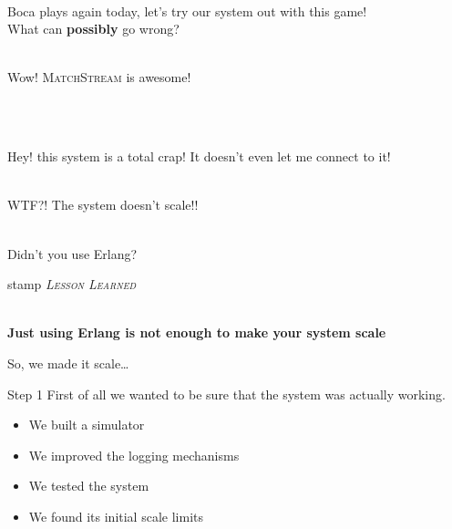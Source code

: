 \documentclass[utf8]{beamer}
\begin{document}
\begin{frame}
	\begin{description}
		\item<+->[Brujo]\ \\ Boca plays again today, let's try our system out with this game!\\ What can \textbf{possibly} go wrong?
		\item<+->[User 1]\ \\ Wow! \textsc{MatchStream} is awesome!
		\item<+->[\ldots]\ 
		\item<+->[User 100]\ \\ Hey! this system is a total crap! It doesn't even let me connect to it!
		\item<+->[Brujo]\ \\ WTF?! \alert{The system doesn't scale}!!
		\item<+->[A Friend]\ \\ Didn't you use \alert{Erlang}?
	\end{description}
\end{frame}

\begin{frame}
	\begin{beamercolorbox}[wd=1\textwidth,shadow=true,rounded=true]{stamp}
		\emph{\textsc{Lesson Learned}}
	\end{beamercolorbox}
	\ \\
	\textbf{Just using Erlang is not enough to make your system scale}
\end{frame}

\begin{frame}
	\begin{center}
		{\Large
			\textsf{So, we made it scale\ldots}}
	\end{center}
\end{frame}

\begin{frame}{Step 1}
First of all we wanted to be sure that the system was actually working.\\
\pause
\begin{itemize}
	\item<+-> We built a simulator
	\item<+-> We improved the logging mechanisms
	\item<+-> We tested the system
	\item<+-> We found its initial scale limits
\end{itemize}
\end{frame}
\end{document}

